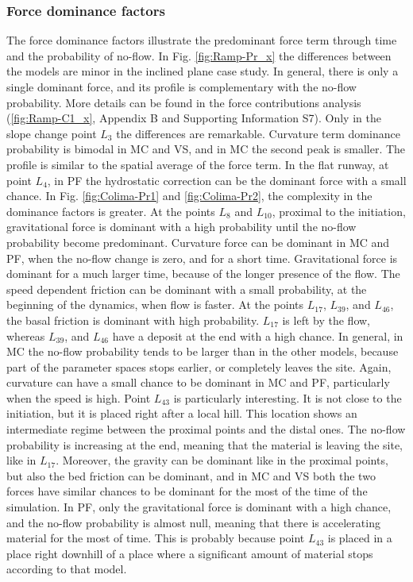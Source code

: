 \documentclass{article}
\begin{document}
\subsubsection{Force dominance factors}
The force dominance factors illustrate the predominant force term through time and the probability of no-flow. In Fig. \ref{fig:Ramp-Pr_x} the differences between the models are minor in the inclined plane case study. In general, there is only a single dominant force, and its profile is complementary with the no-flow probability. More details can be found in the force contributions analysis (\ref{fig:Ramp-C1_x}, Appendix B and Supporting Information S7). Only in the slope change point $L_3$ the differences are remarkable. Curvature term dominance probability is bimodal in MC and VS, and in MC the second peak is smaller. The profile is similar to the spatial average of the force term. In the flat runway, at point $L_4$, in PF the hydrostatic correction can be the dominant force with a small chance. In Fig. \ref{fig:Colima-Pr1} and \ref{fig:Colima-Pr2}, the complexity in the dominance factors is greater. At the points $L_8$ and $L_{10}$, proximal to the initiation, gravitational force is dominant with a high probability until the no-flow probability become predominant. Curvature force can be dominant in MC and PF, when the no-flow change is zero, and for a short time. Gravitational force is dominant for a much larger time, because of the longer presence of the flow. The speed dependent friction can be dominant with a small probability, at the beginning of the dynamics, when flow is faster. At the points $L_{17}$, $L_{39}$, and $L_{46}$, the basal friction is dominant with high probability. $L_{17}$ is left by the flow, whereas $L_{39}$, and $L_{46}$ have a deposit at the end with a high chance. In general, in MC the no-flow probability tends to be larger than in the other models, because part of the parameter spaces stops earlier, or completely leaves the site. Again, curvature can have a small chance to be dominant in MC and PF, particularly when the speed is high. Point $L_{43}$ is particularly interesting. It is not close to the initiation, but it is placed right after a local hill. This location shows an intermediate regime between the proximal points and the distal ones. The no-flow probability is increasing at the end, meaning that the material is leaving the site, like in $L_{17}$. Moreover, the gravity can be dominant like in the proximal points, but also the bed friction can be dominant, and in MC and VS both the two forces have similar chances to be dominant for the most of the time of the simulation. In PF, only the gravitational force is dominant with a high chance, and the no-flow probability is almost null, meaning that there is accelerating material for the most of time. This is probably because point $L_{43}$ is placed in a place right downhill of a place where a significant amount of material stops according to that model.
\end{document}
